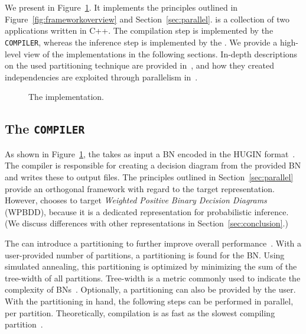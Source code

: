 \section{\toolname}
\label{sec:tool}\label{sec:implementation}

We present \toolname in Figure~\ref{fig:implementation}. It implements the principles outlined in Figure~\ref{fig:frameworkoverview} and Section~\ref{sec:parallel}. \toolname is a collection of two applications written in C++. The compilation step is implemented by the \verb+COMPILER+, whereas the inference step is implemented by the \engine. We provide a high-level view of the implementations in the following sections.
In-depth descriptions on the used partitioning technique are provided in~\cite{dal2017reducing,dal2021compositional}, and how they created independencies are exploited through parallelism in~\cite{dal2018parallel}.

\begin{figure}[!t]
    \centering
    \scalebox{0.9}{
    
    }
    \caption{The implementation.}
    \label{fig:implementation}
\end{figure}

\subsection{The \texttt{COMPILER}}

As shown in Figure~\ref{fig:implementation}, the \compiler takes as input a BN encoded in the HUGIN format~\cite{madsen2003hugin}. The compiler is responsible for creating a decision diagram from the provided BN and writes these to output files. The principles outlined in Section~\ref{sec:parallel} provide an orthogonal framework with regard to the target representation. However, \toolname chooses to target \emph{Weighted Positive Binary Decision Diagrams} (WPBDD), because it is a dedicated representation for probabilistic inference. (We discuss differences with other representations in Section~\ref{sec:conclusion}.)

The \compiler can introduce a partitioning to further improve overall performance~\cite{dal2017reducing}. With a user-provided number of partitions, a partitioning is found for the BN. Using simulated annealing, this partitioning is optimized by minimizing the sum of the  tree-width of all partitions. Tree-width is a metric commonly used to indicate the complexity of BNs~\cite{chen2022definition}. Optionally, a partitioning can also be provided by the user. With the partitioning in hand, the following steps can be performed in parallel, per partition. Theoretically, compilation is as fast as the slowest compiling partition~\cite{dal2018parallel}.

